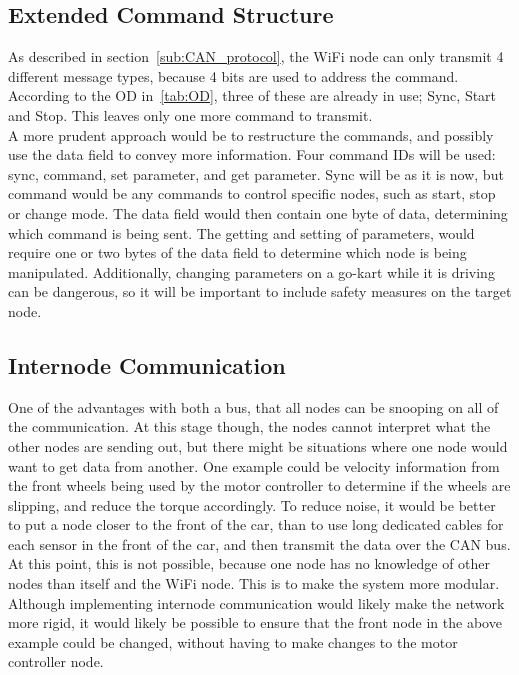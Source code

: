 \subsection*{Extended Command Structure}
As described in section~\ref{sub:CAN_protocol}, the WiFi node can only transmit 4 different message types, because 4 bits are used to address the command. 
According to the OD in~\ref{tab:OD}, three of these are already in use; Sync, Start and Stop. 
This leaves only one more command to transmit.\\

A more prudent approach would be to restructure the commands, and possibly use the data field to convey more information. 
Four command IDs will be used: sync, command, set parameter, and get parameter. 
Sync will be as it is now, but command would be any commands to control specific nodes, such as start, stop or change mode. 
The data field would then contain one byte of data, determining which command is being sent.
The getting and setting of parameters, would require one or two bytes of the data field to determine which node is being manipulated.
Additionally, changing parameters on a go-kart while it is driving can be dangerous, so it will be important to include safety measures on the target node.
\subsection*{Internode Communication}
One of the advantages with both a bus, that all nodes can be snooping on all of the communication.
At this stage though, the nodes cannot interpret what the other nodes are sending out, but there might be situations where one node would want to get data from another.
One example could be velocity information from the front wheels being used by the motor controller to determine if the wheels are slipping, and reduce the torque accordingly. 
To reduce noise, it would be better to put a node closer to the front of the car, than to use long dedicated cables for each sensor in the front of the car, and then transmit the data over the CAN bus.\\

At this point, this is not possible, because one node has no knowledge of other nodes than itself and the WiFi node. 
This is to make the system more modular.
Although implementing internode communication would likely make the network more rigid, it would likely be possible to ensure that the front node in the above example could be changed, without having to make changes to the motor controller node.

